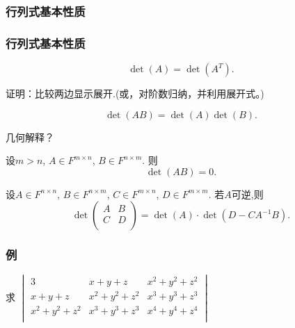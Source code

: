 \subsubsection{行列式基本性质}
\begin{frame}\frametitle{行列式基本性质}
\begin{theorem}
\[\det(A)=\det(A^T).\]
\end{theorem}
\pp
证明：比较两边显示展开.(或，对阶数归纳，并利用展开式。)
\pp
\begin{theorem}
\[\det(AB)=\det(A)\det(B).\]
\end{theorem}
\pp
几何解释？
\pp
\begin{example}
设$m>n$, $A\in F^{m\times n}$, $B\in F^{n\times m}$. 则
\[\det(AB)=0.\]
\end{example}
\pp
\begin{example}
设$A\in F^{n\times n}$, $B\in F^{n\times m}$, $C\in F^{m\times n}$, $D\in F^{m\times m}$. 若$A$可逆,则
\[\det\begin{pmatrix} A&B\\C&D\\\end{pmatrix}=\det(A)\cdot\det(D-CA^{-1}B).\]
\end{example}
\end{frame}




\begin{frame}\frametitle{例}
\begin{example} 求
$\begin{vmatrix}
3& x + y + z & x^2 + y^2 + z^2 \\
x + y + z & x^2 + y^2 + z^2 & x^3 + y^3 + z^3 \\
x^2 + y^2 + z^2 & x^3 + y^3 + z^3 & x^4 + y^4 + z^4 \\
\end{vmatrix}$
\end{example}


\yang{
\[\begin{pmatrix}
3& x + y + z & x^2 + y^2 + z^2 \\
x + y + z & x^2 + y^2 + z^2 & x^3 + y^3 + z^3 \\
x^2 + y^2 + z^2 & x^3 + y^3 + z^3 & x^4 + y^4 + z^4 \\
\end{pmatrix} =
\begin{pmatrix}
1 & 1 & 1 \\
x & y & z \\
x^2 & y^2 & z^2 \\
\end{pmatrix}
\begin{pmatrix}
1 & x & x^2 \\
1 & y & y^2 \\
1 & z & z^2 \\
\end{pmatrix}\]}
\end{frame}

